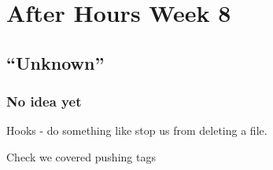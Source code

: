 \chapter{After Hours Week 8}
\section{``Unknown''}
\subsection{No idea yet}
Hooks - do something like stop us from deleting a file.


Check we covered 
pushing tags
